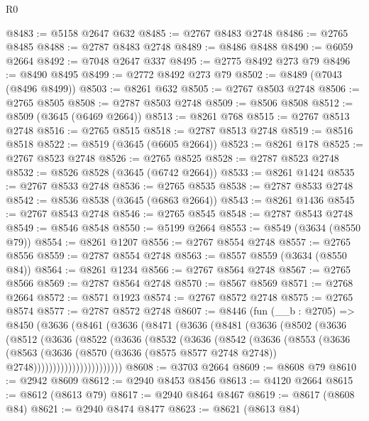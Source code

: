 \begin{lexlean}{R0}
\begin{coremodule}
@8483 := @5158 @2647 @632
@8485 := @2767 @8483 @2748
@8486 := @2765 @8485
@8488 := @2787 @8483 @2748
@8489 := @8486 @8488
@8490 := @6059 @2664
@8492 := @7048 @2647 @337
@8495 := @2775 @8492 @273 @79
@8496 := @8490 @8495
@8499 := @2772 @8492 @273 @79
@8502 := @8489 (@7043 (@8496 @8499))
@8503 := @8261 @632
@8505 := @2767 @8503 @2748
@8506 := @2765 @8505
@8508 := @2787 @8503 @2748
@8509 := @8506 @8508
@8512 := @8509 (@3645 (@6469 @2664))
@8513 := @8261 @768
@8515 := @2767 @8513 @2748
@8516 := @2765 @8515
@8518 := @2787 @8513 @2748
@8519 := @8516 @8518
@8522 := @8519 (@3645 (@6605 @2664))
@8523 := @8261 @178
@8525 := @2767 @8523 @2748
@8526 := @2765 @8525
@8528 := @2787 @8523 @2748
@8532 := @8526 @8528 (@3645 (@6742 @2664))
@8533 := @8261 @1424
@8535 := @2767 @8533 @2748
@8536 := @2765 @8535
@8538 := @2787 @8533 @2748
@8542 := @8536 @8538 (@3645 (@6863 @2664))
@8543 := @8261 @1436
@8545 := @2767 @8543 @2748
@8546 := @2765 @8545
@8548 := @2787 @8543 @2748
@8549 := @8546 @8548
@8550 := @5199 @2664
@8553 := @8549 (@3634 (@8550 @79))
@8554 := @8261 @1207
@8556 := @2767 @8554 @2748
@8557 := @2765 @8556
@8559 := @2787 @8554 @2748
@8563 := @8557 @8559 (@3634 (@8550 @84))
@8564 := @8261 @1234
@8566 := @2767 @8564 @2748
@8567 := @2765 @8566
@8569 := @2787 @8564 @2748
@8570 := @8567 @8569
@8571 := @2768 @2664
@8572 := @8571 @1923
@8574 := @2767 @8572 @2748
@8575 := @2765 @8574
@8577 := @2787 @8572 @2748
@8607 := @8446
    (fun (__b : @2705) =>
    @8450
      (@3636
        (@8461
          (@3636
            (@8471
              (@3636
                (@8481
                  (@3636
                    (@8502
                      (@3636
                        (@8512
                          (@3636
                            (@8522
                              (@3636
                                (@8532
                                  (@3636
                                    (@8542
                                      (@3636
                                        (@8553
                                          (@3636
                                            (@8563
                                              (@3636
                                                (@8570
                                                  (@3636 (@8575 @8577 @2748 @2748))
                                                  @2748)))))))))))))))))))))))
@8608 := @3703 @2664
@8609 := @8608 @79
@8610 := @2942 @8609
@8612 := @2940 @8453 @8456
@8613 := @4120 @2664
@8615 := @8612 (@8613 @79)
@8617 := @2940 @8464 @8467
@8619 := @8617 (@8608 @84)
@8621 := @2940 @8474 @8477
@8623 := @8621 (@8613 @84)

\end{coremodule}
\end{lexlean}
